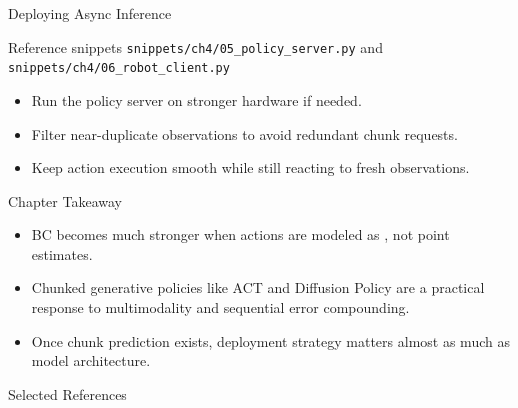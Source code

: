 \documentclass{beamer}
\begin{document}
\begin{frame}{Deploying Async Inference}
  \begin{block}{Reference snippets}
    \texttt{snippets/ch4/05\_policy\_server.py} and \texttt{snippets/ch4/06\_robot\_client.py}
  \end{block}

  \begin{itemize}
    \item Run the policy server on stronger hardware if needed.
    \item Filter near-duplicate observations to avoid redundant chunk requests.
    \item Keep action execution smooth while still reacting to fresh observations.
  \end{itemize}
\end{frame}

\begin{frame}{Chapter Takeaway}
  \begin{itemize}
    \item BC becomes much stronger when actions are modeled as , not point estimates.
    \item Chunked generative policies like ACT and Diffusion Policy are a practical response to multimodality and sequential error compounding.
    \item Once chunk prediction exists, deployment strategy matters almost as much as model architecture.
  \end{itemize}
\end{frame}

\begin{frame}[allowframebreaks]{Selected References}
\scriptsize
\nocite{pomerleauALVINNAutonomousLand1988}

\end{frame}
\end{document}
